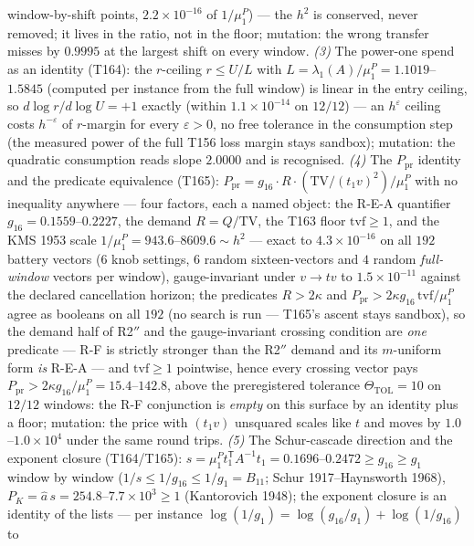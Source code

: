 \documentclass[11pt,a4paper]{article}
\begin{document}
window-by-shift points, $2.2\times10^{-16}$ of $1/\mu^P_1$) --- the
$h^2$ is conserved, never removed; it lives in the ratio, not in the
floor; mutation: the wrong transfer misses by $0.9995$ at the largest
shift on every window. \emph{(3)} The power-one spend as an identity
(T164): the $r$-ceiling $r\le U/L$ with
$L=\lambda_1(A)/\mu^P_1=1.1019$--$1.5845$ (computed per instance from
the full window) is linear in the entry ceiling, so
$d\log r/d\log U=+1$ exactly (within $1.1\times10^{-14}$ on $12/12$)
--- an $h^{\varepsilon}$ ceiling costs $h^{-\varepsilon}$ of
$r$-margin for every $\varepsilon>0$, no free tolerance in the
consumption step (the measured power of the full T156 loss margin
stays sandbox); mutation: the quadratic consumption reads slope
$2.0000$ and is recognised. \emph{(4)} The $P_{\mathrm{pr}}$ identity
and the predicate equivalence (T165):
$P_{\mathrm{pr}}=g_{16}\cdot R\cdot(\mathrm{TV}/(t_1v)^2)/\mu^P_1$
with no inequality anywhere --- four factors, each a named object: the
R-E-A quantifier $g_{16}=0.1559$--$0.2227$, the demand
$R=Q/\mathrm{TV}$, the T163 floor $\mathrm{tvf}\ge1$, and the KMS 1953
scale $1/\mu^P_1=943.6$--$8609.6\sim h^2$ --- exact to
$4.3\times10^{-16}$ on all $192$ battery vectors ($6$ knob settings,
$6$ random sixteen-vectors and $4$ random \emph{full-window} vectors
per window), gauge-invariant under $v\to tv$ to $1.5\times10^{-11}$
against the declared cancellation horizon; the predicates $R>2\kappa$
and $P_{\mathrm{pr}}>2\kappa g_{16}\,\mathrm{tvf}/\mu^P_1$ agree as
booleans on all $192$ (no search is run --- T165's ascent stays
sandbox), so the demand half of R2$''$ and the gauge-invariant
crossing condition are \emph{one} predicate --- R-F is strictly
stronger than the R2$''$ demand and its $m$-uniform form \emph{is}
R-E-A --- and $\mathrm{tvf}\ge1$ pointwise, hence every crossing
vector pays $P_{\mathrm{pr}}>2\kappa g_{16}/\mu^P_1=15.4$--$142.8$,
above the preregistered tolerance $\Theta_{\mathrm{TOL}}=10$ on
$12/12$ windows: the R-F conjunction is \emph{empty} on this surface
by an identity plus a floor; mutation: the price with $(t_1v)$
unsquared scales like $t$ and moves by $1.0$--$1.0\times10^{4}$ under
the same round trips. \emph{(5)} The Schur-cascade direction and the
exponent closure (T164/T165):
$s=\mu^P_1t_1^{\mathsf T}A^{-1}t_1=0.1696$--$0.2472\ge g_{16}\ge g_1$
window by window ($1/s\le1/g_{16}\le1/g_1=B_{11}$; Schur
1917--Haynsworth 1968), $P_K=\hat a\,s=254.8$--$7.7\times10^{3}\ge1$
(Kantorovich 1948); the exponent closure is an identity of the lists
--- per instance $\log(1/g_1)=\log(g_{16}/g_1)+\log(1/g_{16})$ to
\end{document}

